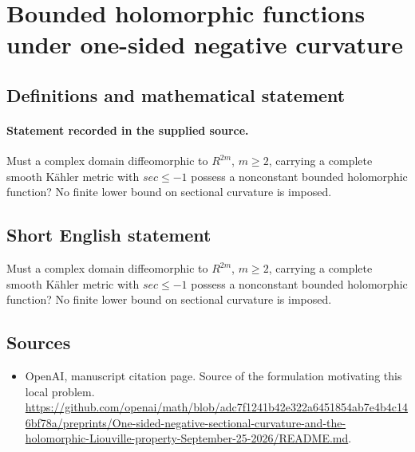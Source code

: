 \documentclass[11pt]{article}
\begin{document}
\section*{Bounded holomorphic functions under one-sided negative curvature}\label{statement}
\subsection{Definitions and mathematical statement}
\paragraph{Statement recorded in the supplied source.}
Must a complex domain diffeomorphic to $R^{2m}$, $m\geq 2$, carrying a complete smooth Kähler metric with $sec\leq -1$ possess a nonconstant bounded holomorphic function? No finite lower bound on sectional curvature is imposed.
\subsection{Short English statement}
Must a complex domain diffeomorphic to $R^{2m}$, $m\geq 2$, carrying a complete smooth Kähler metric with $sec\leq -1$ possess a nonconstant bounded holomorphic function? No finite lower bound on sectional curvature is imposed.
\subsection{Sources}
\begin{itemize}
\item[S1] OpenAI, manuscript citation page. Source of the formulation motivating this local problem.
\url{https://github.com/openai/math/blob/adc7f1241b42e322a6451854ab7e4b4c146bf78a/preprints/One-sided-negative-sectional-curvature-and-the-holomorphic-Liouville-property-September-25-2026/README.md}.
\end{itemize}
\end{document}
